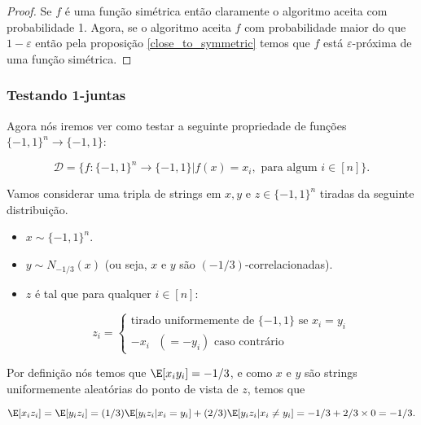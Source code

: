 \begin{proof}

Se $f$ é uma função simétrica então claramente o algoritmo aceita com probabilidade 1. Agora, se o algoritmo aceita $f$ com probabilidade maior do que $1 - \varepsilon$ então pela proposição \ref{close_to_symmetric} temos que $f$ está $\varepsilon$-próxima de uma função simétrica.

\end{proof}

\subsubsection{Testando 1-juntas}

Agora nós iremos ver como testar a seguinte propriedade de funções $\{-1, 1\}^{n} \to \{-1, 1\}$:

\begin{equation*}
	\mathcal{D} = \{f: \{-1, 1\}^{n} \to \{-1, 1\} \lvert f(x) = x_{i}, \text{ para algum } i \in [n]\}.
\end{equation*}

Vamos considerar uma tripla de strings em $x, y$ e $z \in \{-1, 1\}^{n}$ tiradas da seguinte distribuição.

\begin{itemize}

	\item $x \sim \{-1, 1\}^{n}$.
	
	\item $y \sim N_{-1/3}(x)$ (ou seja, $x$ e $y$ são $(-1/3)$-correlacionadas).
	
	\item $z$ é tal que para qualquer $i \in [n]$:
	
	\begin{equation*}
		z_{i} = \begin{cases}
				\text{tirado uniformemente de } \{-1, 1\} \text{ se } x_{i} = y_{i} \\
				-x_{i} \text{ } (= - y_{i}) \text{ caso contrário}
			  \end{cases}
	\end{equation*}

\end{itemize}

Por definição nós temos que $\E[x_{i}y_{i}] = -1/3$, e como $x$ e $y$ são strings uniformemente aleatórias do ponto de vista de $z$, temos que

\begin{equation*}
	\E[x_{i}z_{i}] = \E[y_{i}z_{i}] = (1/3)\E[y_{i}z_{i} \lvert x_{i} = y_{i}] + (2/3)\E[y_{i}z_{i} \lvert x_{i} \neq y_{i}]=-1/3 + 2/3 \times 0 = -1/3.
\end{equation*}

